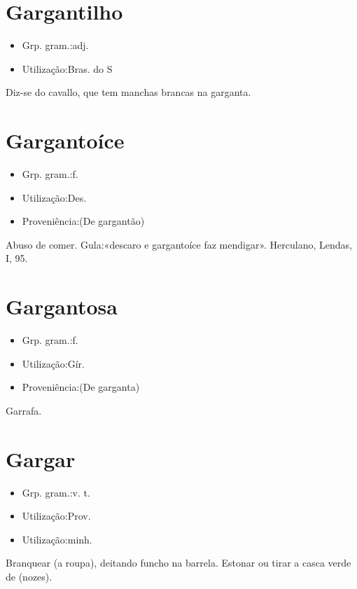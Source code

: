 \section{Gargantilho}
\begin{itemize}
\item {Grp. gram.:adj.}
\end{itemize}
\begin{itemize}
\item {Utilização:Bras. do S}
\end{itemize}
Diz-se do cavallo, que tem manchas brancas na garganta.
\section{Gargantoíce}
\begin{itemize}
\item {Grp. gram.:f.}
\end{itemize}
\begin{itemize}
\item {Utilização:Des.}
\end{itemize}
\begin{itemize}
\item {Proveniência:(De \textunderscore gargantão\textunderscore )}
\end{itemize}
Abuso de comer.
Gula:«\textunderscore descaro e gargantoíce faz mendigar\textunderscore ». Herculano, \textunderscore Lendas\textunderscore , I, 95.
\section{Gargantosa}
\begin{itemize}
\item {Grp. gram.:f.}
\end{itemize}
\begin{itemize}
\item {Utilização:Gír.}
\end{itemize}
\begin{itemize}
\item {Proveniência:(De \textunderscore garganta\textunderscore )}
\end{itemize}
Garrafa.
\section{Gargar}
\begin{itemize}
\item {Grp. gram.:v. t.}
\end{itemize}
\begin{itemize}
\item {Utilização:Prov.}
\end{itemize}
\begin{itemize}
\item {Utilização:minh.}
\end{itemize}
Branquear (a roupa), deitando funcho na barrela.
Estonar ou tirar a casca verde de (nozes).
